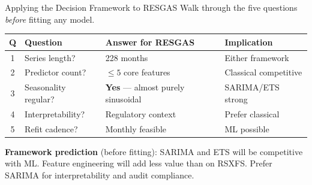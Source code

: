 \documentclass[aspectratio=169, 10pt]{beamer}
\begin{document}
\begin{frame}{Applying the Decision Framework to RESGAS}
  {\small Walk through the five questions \emph{before} fitting any model.}
  \vspace{0.1cm}
  \begin{center}
  {\small
  \begin{tabular}{clp{5.2cm}l}
    \toprule
    \textbf{Q} & \textbf{Question} & \textbf{Answer for RESGAS} & \textbf{Implication} \\
    \midrule
    1 & Series length? & 228 months & Either framework \\
    2 & Predictor count? & $\leq 5$ core features & Classical competitive \\
    3 & Seasonality regular? & \textbf{Yes} --- almost purely sinusoidal & SARIMA/ETS strong \\
    4 & Interpretability? & Regulatory context & Prefer classical \\
    5 & Refit cadence? & Monthly feasible & ML possible \\
    \bottomrule
  \end{tabular}
  }
  \end{center}
  \vspace{0.15cm}
  \begin{keybox}
    {\small \textbf{Framework prediction} (before fitting):
    SARIMA and ETS will be competitive with ML.
    Feature engineering will add less value than on RSXFS.
    Prefer SARIMA for interpretability and audit compliance.}
  \end{keybox}
\end{frame}
\end{document}

